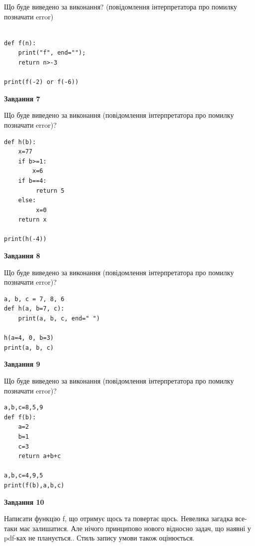 \documentclass[12pt, ukrainian]{article}
\begin{document}
{\begin {large}
Що буде виведено за виконання? (повідомлення інтерпретатора про помилку позначати error)\par
\begin{verbatim}

def f(n):
    print("f", end="");
    return n>-3

print(f(-2) or f(-6))
\end{verbatim}

{\begin {center}\textbf{Завдання 7}\end {center}}

Що буде виведено за виконання (повідомлення інтерпретатора про помилку позначати error)?\par
\begin{verbatim}
def h(b):
    x=77
    if b>=1: 
        x=6
    if b==4:
         return 5
    else:
         x=0
    return x

print(h(-4))
\end{verbatim}

{\begin {center}\textbf{Завдання 8}\end {center}}

Що буде виведено за виконання (повідомлення інтерпретатора про помилку позначати error)?\par
\begin{verbatim}
a, b, c = 7, 8, 6
def h(a, b=7, c):
    print(a, b, c, end=" ")

h(a=4, 0, b=3)
print(a, b, c)
\end{verbatim}

{\begin {center}\textbf{Завдання 9}\end {center}}

Що буде виведено за виконання (повідомлення інтерпретатора про помилку позначати error)?\par
\begin{verbatim}
a,b,c=8,5,9
def f(b):
    a=2
    b=1
    c=3
    return a+b+c

a,b,c=4,9,5
print(f(b),a,b,c)
\end{verbatim}

{\begin {center}\textbf{Завдання 10}\end {center}}


Написати функцiю f, що отримує щось та повертає щось. Невелика загадка все-таки має залишатися. Але нічого принципово нового відносно задач, що наявні у pdf-ках не планується.. Стиль запису умови також оцінюється.\par
\end {large}}
\newpage
\end{document}
